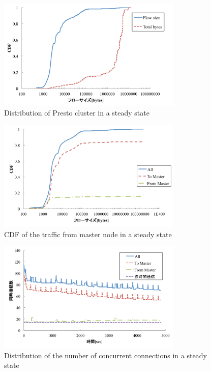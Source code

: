 \begin{figure}[t]
    \begin{center}
    \includegraphics[autoebb, width=250pt]{./img/constant.pdf}
    \caption{Distribution of Presto cluster in a steady state}
    \label{fig:constant}
    \end{center}
\end{figure}

\begin{figure}[t]
    \begin{center}
    \includegraphics[autoebb, width=250pt]{./img/constant_cdf.pdf}
    \caption{CDF of the traffic from master node in a
    steady state}
    \label{fig:constant_cdf}
    \end{center}
\end{figure}

\begin{figure}[t]
    \begin{center}
    \includegraphics[autoebb, width=250pt]{./img/constant_conc.pdf}
    \caption{Distribution of the number of concurrent
    connections in a steady state}
    \label{fig:constant_conc}
    \end{center}
\end{figure}

